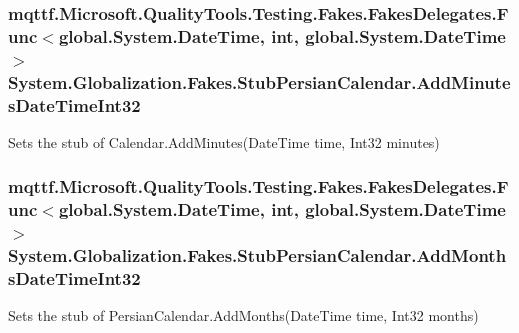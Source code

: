 \hypertarget{class_system_1_1_globalization_1_1_fakes_1_1_stub_persian_calendar_a5323dc095cebdc40f42385ff7452e242}{
\subsubsection[{Add\-Minutes\-Date\-Time\-Int32}]{\setlength{\rightskip}{0pt plus 5cm}mqttf.\-Microsoft.\-Quality\-Tools.\-Testing.\-Fakes.\-Fakes\-Delegates.\-Func$<$global.\-System.\-Date\-Time, int, global.\-System.\-Date\-Time$>$ System.\-Globalization.\-Fakes.\-Stub\-Persian\-Calendar.\-Add\-Minutes\-Date\-Time\-Int32}}\label{class_system_1_1_globalization_1_1_fakes_1_1_stub_persian_calendar_a5323dc095cebdc40f42385ff7452e242}


Sets the stub of Calendar.\-Add\-Minutes(\-Date\-Time time, Int32 minutes)

\hypertarget{class_system_1_1_globalization_1_1_fakes_1_1_stub_persian_calendar_acc43f2b67afd5dc328309eb2699e0e39}{
\subsubsection[{Add\-Months\-Date\-Time\-Int32}]{\setlength{\rightskip}{0pt plus 5cm}mqttf.\-Microsoft.\-Quality\-Tools.\-Testing.\-Fakes.\-Fakes\-Delegates.\-Func$<$global.\-System.\-Date\-Time, int, global.\-System.\-Date\-Time$>$ System.\-Globalization.\-Fakes.\-Stub\-Persian\-Calendar.\-Add\-Months\-Date\-Time\-Int32}}\label{class_system_1_1_globalization_1_1_fakes_1_1_stub_persian_calendar_acc43f2b67afd5dc328309eb2699e0e39}


Sets the stub of Persian\-Calendar.\-Add\-Months(\-Date\-Time time, Int32 months)

